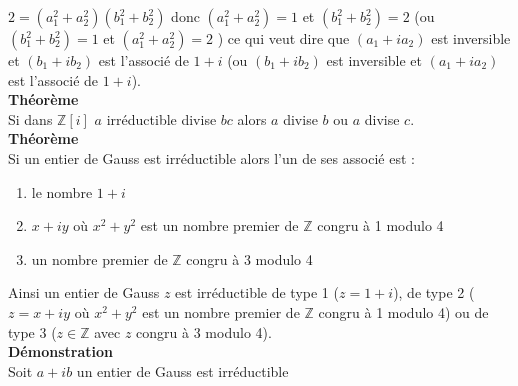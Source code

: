 \documentclass[a4paper,11pt]{book}
\newcommand{\Z}{{\mathbb{Z}}}
\begin{document}
$2=(a_1^2+a_2^2)(b_1^2+b_2^2)$ donc
$(a_1^2+a_2^2)=1$ et $(b_1^2+b_2^2)=2$ (ou $(b_1^2+b_2^2)=1$ et 
$(a_1^2+a_2^2)=2$ ) ce qui veut dire que $(a_1+ia_2)$ est 
inversible et $(b_1+ib_2)$ est l'associ\'e de $1+i$ (ou
$(b_1+ib_2)$ est inversible et $(a_1+ia_2)$ est l'associ\'e de $1+i$).\\
{\bf Th\'eor\`eme}\\
Si dans $\Z[i]$ $a$ irr\'eductible divise $bc$ alors $a$ divise $b$ ou 
$a$ divise $c$.\\
{\bf Th\'eor\`eme}\\
Si un entier de Gauss est irr\'eductible alors l'un de ses associ\'e est :
\begin{enumerate}
\item le nombre $1+i$
\item $x+iy$ o\`u $x^2+y^2$ est un nombre premier de $\Z$  congru \`a 1 
modulo 4
\item un nombre premier de $\Z$ congru \`a 3 modulo 4
\end{enumerate}
Ainsi un entier de Gauss $z$ est irr\'eductible de type 1 ($z=1+i$), de type 2 
($z=x+iy$ o\`u $x^2+y^2$ est un nombre premier de $\Z$  congru \`a 1 
modulo 4) ou de type 3 ($z\in\Z$ avec $z$  congru \`a 3 modulo 4).\\
{\bf D\'emonstration}\\
Soit $a+ib$ un entier de Gauss est irr\'eductible
\end{document}
